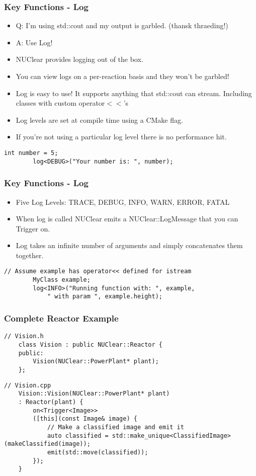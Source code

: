 \documentclass{beamer}
\begin{document}
\begin{frame}[fragile]
	\frametitle{Key Functions - Log}
	\begin{itemize}
		\item Q: I'm using std::cout and my output is garbled. (thansk thraeding!)
		\item A: Use Log!
		\item NUClear provides logging out of the box.
		\item You can view logs on a per-reaction basis and they won't be garbled!
		\item Log is easy to use! It supports anything that std::cout can stream.
			Including classes with custom operator$<<$'s
		\item Log levels are set at compile time using a CMake flag.
		\item If you're not using a particular log level there is no performance hit.
	\end{itemize}

	\begin{lstlisting}[language=nuclear]
		int number = 5;
		log<DEBUG>("Your number is: ", number);
	\end{lstlisting}
\end{frame}

\begin{frame}[fragile]
	\frametitle{Key Functions - Log}
	\begin{itemize}
		\item Five Log Levels: TRACE, DEBUG, INFO, WARN, ERROR, FATAL
		\item When log is called NUClear emits a NUClear::LogMessage that you can Trigger on.
		\item Log takes an infinite number of arguments and simply concatenates them together.
	\end{itemize}

	\begin{lstlisting}[language=nuclear]
		// Assume example has operator<< defined for istream
		MyClass example;
		log<INFO>("Running function with: ", example,
		    " with param ", example.height);
	\end{lstlisting}
\end{frame}

\begin{frame}[fragile]
	\frametitle{Complete Reactor Example}

	\begin{lstlisting}[language=nuclear]
	// Vision.h
	class Vision : public NUClear::Reactor {
	public:
	    Vision(NUClear::PowerPlant* plant);
	};
	\end{lstlisting}

	\begin{lstlisting}[language=nuclear]
	// Vision.cpp
	Vision::Vision(NUClear::PowerPlant* plant)
	: Reactor(plant) {
	    on<Trigger<Image>>
	    ([this](const Image& image) {
	        // Make a classified image and emit it
	        auto classified = std::make_unique<ClassifiedImage>(makeClassified(image));
	        emit(std::move(classified));
	    });
	}
	\end{lstlisting}
\end{frame}
\end{document}
